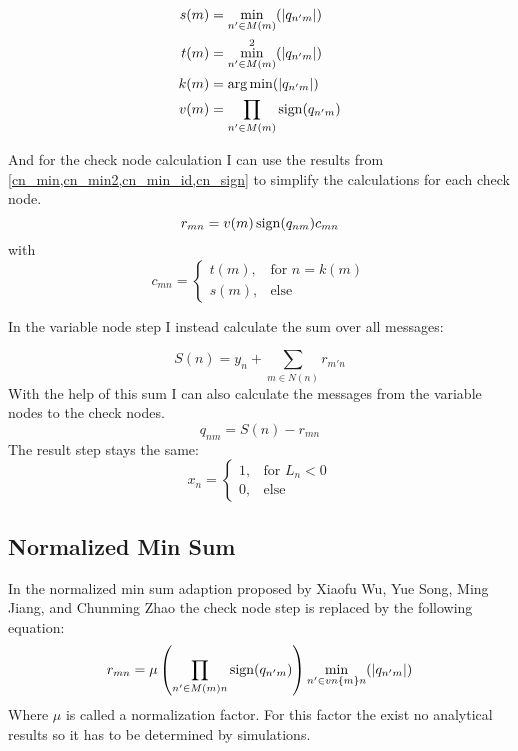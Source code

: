 \begin{align}
    s(m) & = \min_{n' \in M(m)}(\left|q_{n'm}\right|) \label{cn_min}\\
    t(m) & = \min_{n' \in M(m)}^2(\left|q_{n'm}\right|) \label{cn_min2}\\
    k(m) & = \operatorname*{arg\,min} (\left|q_{n'm}\right|) \label{cn_min_id}\\
    v(m) & =  \prod_{n' \in M(m)}\operatorname{sign}(q_{n'm}) \label{cn_sign}
\end{align}

And for the check node calculation I can use the results from \cref{cn_min,cn_min2,cn_min_id,cn_sign} to simplify the calculations for each check node.
\begin{equation}
    r_{mn} = v(m) \operatorname{sign}(q_{nm}) c_{mn} \label{cn_loc}
\end{equation}
with
\begin{equation}
    c_{mn} = \begin{cases}
        t(m), & \text{for } n = k(m) \\
        s(m), & \text{else}
    \end{cases}
\end{equation}

In the variable node step I instead calculate the sum over all messages:

\begin{equation}
    S(n) = y_n + \sum_{m \in N(n)}r_{m'n}  \label{vn_sum}
\end{equation}
With the help of this sum I can also calculate the messages from the variable nodes to the check nodes.
\begin{equation}
    q_{nm} = S(n) - r_{mn} \label{vn_loc}
\end{equation}
The result step stays the same:
\begin{equation}
    x_n = \begin{cases}
        1, & \text{for } L_n < 0 \\
        0, & \text{else}
    \end{cases}
\end{equation}

\subsection{Normalized Min Sum}
In the normalized min sum adaption proposed by Xiaofu Wu, Yue Song, Ming Jiang, and Chunming Zhao\cite{WuSo10} the check node step is replaced by the following equation:
\begin{equation}
    r_{mn} = \mu \left( \prod_{n' \in M(m)\\n}\operatorname{sign}(q_{n'm}) \right) \min_{n' \in vn\{m\}\\n}(\left|q_{n'm}\right|)
\end{equation}
Where $\mu$ is called a normalization factor. For this factor the exist no analytical results so it has to be determined by simulations.

